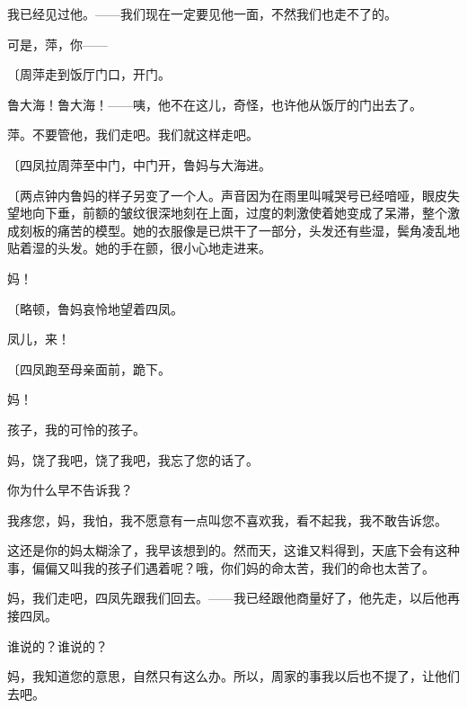 我已经见过他。——我们现在一定要见他一面，不然我们也走不了的。

可是，萍，你——

{\fangsong〔周萍走到饭厅门口，开门。}

鲁大海！鲁大海！——咦，他不在这儿，奇怪，也许他从饭厅的门出去了。

萍。不要管他，我们走吧。我们就这样走吧。

{\fangsong〔四凤拉周萍至中门，中门开，鲁妈与大海进。}

{\fangsong〔两点钟内鲁妈的样子另变了一个人。声音因为在雨里叫喊哭号已经喑哑，眼皮失望地向下垂，前额的皱纹很深地刻在上面，过度的刺激使着她变成了呆滞，整个激成刻板的痛苦的模型。她的衣服像是已烘干了一部分，头发还有些湿，鬓角凌乱地贴着湿的头发。她的手在颤，很小心地走进来。}

妈！

{\fangsong〔略顿，鲁妈哀怜地望着四凤。}

凤儿，来！

{\fangsong〔四凤跑至母亲面前，跪下。}

妈！

孩子，我的可怜的孩子。

妈，饶了我吧，饶了我吧，我忘了您的话了。

你为什么早不告诉我？

我疼您，妈，我怕，我不愿意有一点叫您不喜欢我，看不起我，我不敢告诉您。

这还是你的妈太糊涂了，我早该想到的。然而天，这谁又料得到，天底下会有这种事，偏偏又叫我的孩子们遇着呢？哦，你们妈的命太苦，我们的命也太苦了。

妈，我们走吧，四凤先跟我们回去。——我已经跟他商量好了，他先走，以后他再接四凤。

谁说的？谁说的？

妈，我知道您的意思，自然只有这么办。所以，周家的事我以后也不提了，让他们去吧。


